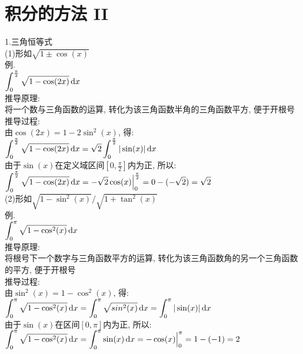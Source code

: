 \chapter{积分的方法 II}
1.三角恒等式\\
(1)形如$\sqrt{1\pm\cos(x)}$\\
例.\\
$\displaystyle\int_0^{\frac{\pi}{2}}\sqrt{1-\cos(2x)}\mathop{}\!\mathrm{d} x$\\
推导原理:\\
将一个数与三角函数的运算, 转化为该三角函数半角的三角函数平方, 便于开根号\\
推导过程:\\
由$\cos(2x)=1-2\sin^2(x)$, 得:\\
$\displaystyle\int_0^{\frac{\pi}{2}}\sqrt{1-\cos(2x)}\mathop{}\!\mathrm{d} x=\sqrt{2}\int_0^{\frac{\pi}{2}}|\sin(x)|\mathop{}\!\mathrm{d} x$\\
由于$\sin(x)$在定义域区间$[0,\frac{\pi}{2}]$内为正, 所以:\\
$\displaystyle\int_0^{\frac{\pi}{2}}\sqrt{1-\cos(2x)}\mathop{}\!\mathrm{d} x=-\sqrt{2}\cos(x)\Big{|}_0^{\frac{\pi}{2}}=0-(-\sqrt{2})=\sqrt{2}$\\

(2)形如$\sqrt{1-\sin^2(x)}/\sqrt{1+\tan^2(x)}$\\
例.\\
$\displaystyle\int_0^{\pi}\sqrt{1-\cos^2(x)}\mathop{}\!\mathrm{d} x$\\
推导原理:\\
将根号下一个数字与三角函数平方的运算, 转化为该三角函数角的另一个三角函数的平方, 便于开根号\\
推导过程:\\
由$\sin^2(x)=1-\cos^2(x)$, 得:\\
$\displaystyle\int_0^{\pi}\sqrt{1-\cos^2(x)}\mathop{}\!\mathrm{d} x=\int_0^{\pi}\sqrt{sin^2(x)}\mathop{}\!\mathrm{d} x=\int_0^{\pi}|\sin(x)|\mathop{}\!\mathrm{d} x$\\
由于$\sin(x)$在区间$[0,\pi]$内为正, 所以:\\
$\displaystyle\int_0^{\pi}\sqrt{1-\cos^2(x)}\mathop{}\!\mathrm{d} x=\int_0^{\pi}\sin(x)\mathop{}\!\mathrm{d} x=-\cos(x)\Big{|}_0^{\pi}=1-(-1)=2$\\

